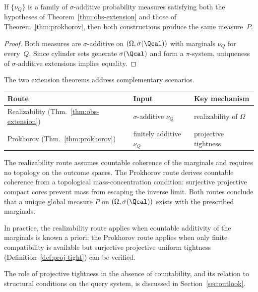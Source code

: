 \begin{proposition}
\label{prop:route-consistency}
If $\{\nu_Q\}$ is a family of $\sigma$-additive probability measures
satisfying both the hypotheses of Theorem~\ref{thm:obs-extension}
and those of Theorem~\ref{thm:prokhorov}, then both constructions
produce the same measure~$P$.
\end{proposition}
\begin{proof}
Both measures are $\sigma$-additive on $(\Omega,\sigma(\Qcal))$
with marginals $\nu_Q$ for every~$Q$.
Since cylinder sets generate $\sigma(\Qcal)$ and form a
$\pi$-system, uniqueness of $\sigma$-additive extensions implies
equality.
\end{proof}

\begin{remark}
The two extension theorems address complementary scenarios.

\smallskip
\begin{center}
\begin{tabular}{lll}
\hline
Route & Input & Key mechanism \\
\hline
Realizability (Thm.~\ref{thm:obs-extension}) &
  $\sigma$-additive $\nu_Q$ & realizability of $\Omega$ \\
Prokhorov (Thm.~\ref{thm:prokhorov}) &
  finitely additive $\nu_Q$ & projective tightness \\
\hline
\end{tabular}
\end{center}

\smallskip\noindent
The realizability route assumes countable coherence of the marginals and
requires no topology on the outcome spaces.  The Prokhorov route derives
countable coherence from a topological mass-concentration condition:
surjective projective compact cores prevent mass from escaping the
inverse limit.  Both routes conclude that a unique global measure $P$
on $(\Omega,\sigma(\Qcal))$ exists with the prescribed marginals.

In practice, the realizability route applies when countable additivity
of the marginals is known a priori; the Prokhorov route applies when
only finite compatibility is available but surjective projective
uniform tightness (Definition~\ref{def:proj-tight}) can be verified.

The role of projective tightness in the absence of countability, and
its relation to structural conditions on the query system, is discussed
in Section~\ref{sec:outlook}.
\end{remark}

